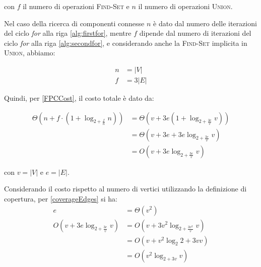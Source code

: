 con $f$ il numero di operazioni \textsc{Find-Set} e $n$ il numero di operazioni \textsc{Union}.

Nel caso della ricerca di componenti connesse $n$ è dato dal numero delle iterazioni del
ciclo \textit{for} alla riga \ref{alg:firstfor}, mentre $f$ dipende dal numero di iterazioni
del ciclo \textit{for} alla riga \ref{alg:secondfor}, e considerando anche la \textsc{Find-Set}
implicita in \textsc{Union}, abbiamo:

\begin{equation}
    \label{FPCValues}
    \begin{aligned}
        n & = |V|   \\
        f & = 3 |E|
    \end{aligned}
\end{equation}

Quindi, per \eqref{FPCCost}, il costo totale è dato da:

\begin{equation}
    \label{FPC2Cost}
    \begin{aligned}
        \Theta(n+f\cdot (1+\log_{2+\frac{f}{n}}n)) & = \Theta(v + 3e ( 1+\log_{2+\frac{3e}{v}}v)) \\
                                                   & = \Theta(v + 3e + 3e\log_{2+\frac{3e}{v}}v)  \\
                                                   & = O(v + 3e\log_{2+\frac{3e}{v}}v)
    \end{aligned}
\end{equation}

con $v = |V|$ e $e = |E|$.

Considerando il costo rispetto al numero di vertici utilizzando la definizione di copertura, per \eqref{coverageEdges} si ha:
\begin{equation}
    \label{WorstFPC2Cost}
    \begin{aligned}
        e                               & = \Theta(v^2)                         \\
        O(v + 3e\log_{2+\frac{3e}{v}}v) & = O(v + 3v^2\log_{2+\frac{3v^2}{v}}v) \\
                                        & = O(v + v^2\log_2{2+3v}v)             \\
                                        & = O(v^2\log_{2+3v}v)
    \end{aligned}
\end{equation}

